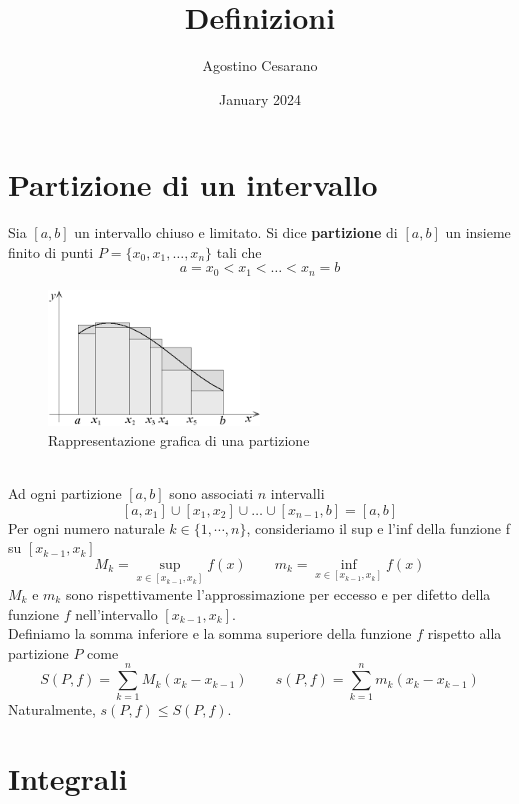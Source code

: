 \documentclass{article}
\title{Definizioni}
\author{Agostino Cesarano}
\date{January 2024}
\begin{document}
\maketitle
\setcounter{part}{4}
\part{Partizione di un intervallo}
Sia $[a,b]$ un intervallo chiuso e limitato. Si dice \textbf{partizione} di
$[a,b]$ un insieme finito di punti $P=\{x_0,x_1,\dots,x_n\}$ tali che
\begin{equation*}
    a=x_0<x_1<\dots<x_n=b
\end{equation*}
\begin{figure}[h]
    \centering
    \includegraphics[width=0.5\textwidth]{partizioni.png}
    \caption{Rappresentazione grafica di una partizione}
\end{figure}\\
Ad ogni partizione $[a,b]$ sono associati $n$ intervalli
\[[a,x_1]\cup[x_1,x_2]\cup \dots \cup [x_{n-1},b]=[a,b]\]
Per ogni numero naturale $k \in \{1,\cdots, n\}$, consideriamo il sup e l'inf della funzione f su $[x_{k-1}, x_k]$
\begin{equation*}
    M_k = \sup_{x \in [x_{k-1},x_k]} f(x) \qquad m_k = \inf_{x \in [x_{k-1},x_k]} f(x)
\end{equation*}
$M_k$ e $m_k$ sono rispettivamente l'approssimazione per eccesso e per difetto della funzione $f$ nell'intervallo $[x_{k-1},x_k]$.\\
Definiamo la somma inferiore e la somma superiore della funzione $f$ rispetto alla partizione $P$ come
\begin{equation*}
    S(P,f) = \sum_{k=1}^n M_k(x_k-x_{k-1}) \qquad s(P,f) = \sum_{k=1}^n m_k(x_k-x_{k-1})
\end{equation*}
Naturalmente, $s(P,f) \leq S(P,f)$.
\part{Integrali}
\end{document}
